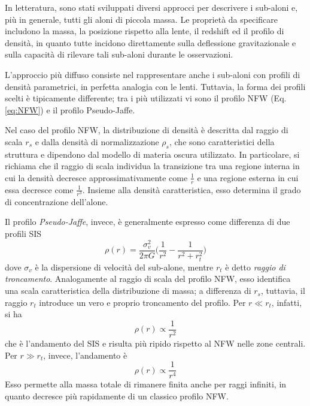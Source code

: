 In letteratura, sono stati sviluppati diversi approcci per descrivere i sub-aloni e, più in generale, tutti gli aloni di piccola massa. Le proprietà da specificare includono la massa, la posizione rispetto alla lente, il redshift ed il profilo di densità, in quanto tutte incidono direttamente sulla deflessione gravitazionale e sulla capacità di rilevare tali sub-aloni durante le osservazioni.

L'approccio più diffuso consiste nel rappresentare anche i sub-aloni con profili di densità parametrici, in perfetta analogia con le lenti. Tuttavia, la forma dei profili scelti è tipicamente differente; tra i più utilizzati vi sono il profilo NFW (Eq. \ref{eq:NFW}) e il profilo Pseudo-Jaffe. 

Nel caso del profilo NFW, la distribuzione di densità è descritta dal raggio di scala $r_s$ e dalla densità di normalizzazione $\rho_s$, che sono caratteristici della struttura e dipendono dal modello di materia oscura utilizzato. In particolare, si richiama che il raggio di scala individua la transizione tra una regione interna in cui la densità decresce approssimativamente come $\frac{1}{r}$ e una regione esterna in cui essa decresce come $\frac{1}{r^3}$. Insieme alla densità caratteristica, esso determina il grado di concentrazione dell'alone.

Il profilo \emph{Pseudo-Jaffe}, invece, è generalmente espresso come differenza di due profili SIS 
\begin{equation}
    \rho(r)=\frac{\sigma_v^2}{2\pi G}\Big(\frac{1}{r^2}-\frac{1}{r^2+r_t^2}\Big) 
\end{equation}
dove $\sigma_v$ è la dispersione di velocità del sub-alone, mentre $r_t$ è detto \emph{raggio di troncamento}. Analogamente al raggio di scala del profilo NFW, esso identifica una scala caratteristica della distribuzione di massa; a differenza di $r_s$, tuttavia, il raggio $r_t$ introduce un vero e proprio troncamento del profilo. 
Per $r\ll r_t$, infatti, si ha 
\begin{equation}
    \rho(r) \propto \frac{1}{r^2}
\end{equation}
che è l'andamento del SIS e risulta più ripido rispetto al NFW nelle zone centrali. Per $r\gg r_t$, invece, l'andamento è 
\begin{equation}
    \rho(r) \propto\frac{1}{r^4}
\end{equation}
Esso permette alla massa totale di rimanere finita anche per raggi infiniti, in quanto decresce più rapidamente di un classico profilo NFW. 

